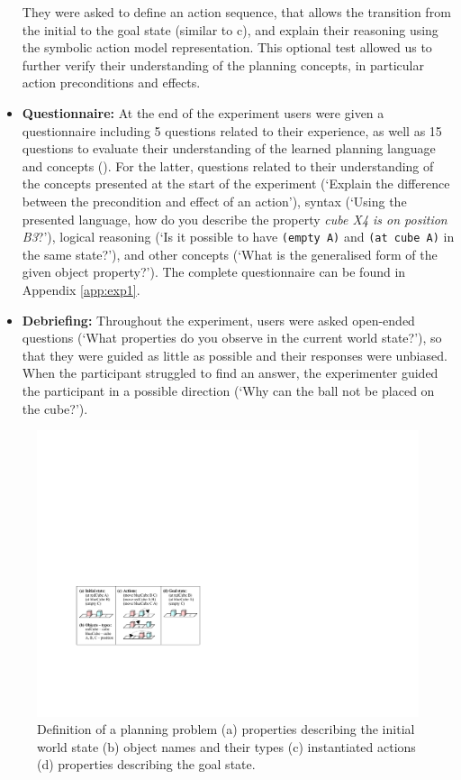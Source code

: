 \begin{itemize}
{They were asked to define an action sequence, that allows the transition from the initial to the goal state (similar to c), and explain their reasoning using the symbolic action model representation.
This optional test allowed us to further verify their understanding of the planning concepts, in particular action preconditions and effects.}
  \item{\textbf{Questionnaire:} At the end of the experiment users were given a questionnaire including 5 questions related to their experience, as well as 15 questions to evaluate their understanding of the learned planning language and concepts ().
  For the latter, questions related to their understanding of the concepts presented at the start of the experiment (\eg `Explain the difference between the precondition and effect of an action'), syntax (\eg `Using the presented language, how do you describe the property \textit{cube X4 is on position B3}?'),
  logical reasoning 
  	(\eg `Is it possible to have \texttt{(empty A)} and \texttt{(at cube A)} in the same state?'), and other concepts (\eg `What is the generalised form of the given object property?').
  The complete questionnaire can be found in Appendix \ref{app:exp1}.}
   \item {\textbf{Debriefing:} Throughout the experiment, users were asked open-ended questions (\eg `What properties do you observe in the current world state?'), so that they were guided as little as possible and their responses were unbiased.
When the participant struggled to find an answer, the experimenter guided the participant in a possible direction (\eg `Why can the ball not be placed on the cube?').} 
\end{itemize}

\begin{figure}[ht]
	\centering
	\includegraphics[width=0.7\linewidth]{figures/planning-permutation}
	\caption{Definition of a planning problem (a) properties describing the initial world state (b) object names and their types (c) instantiated actions (d) properties describing the goal state.}
	\label{fig:planning-permutation}
\end{figure}


